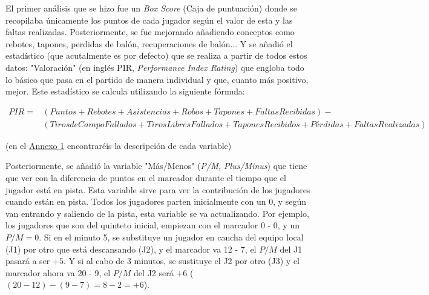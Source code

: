 \documentclass[paper=a4, fontsize=9pt]{article}
\begin{document}
El primer análisis que se hizo fue un \emph{Box Score} (Caja de puntuación) donde se recopilaba únicamente los puntos de cada jugador según el valor de esta y las faltas realizadas. Posteriormente, se fue mejorando añadiendo conceptos como rebotes, tapones, perdidas de balón, recuperaciones de balón... Y se añadió el estadístico (que acutalmente es por defecto) que se realiza a partir de todos estos datos: "Valoración" (en inglés PIR, \emph{Performance Index Rating}) que engloba todo lo básico que pasa en el partido de manera individual y que, cuanto más positivo, mejor. Este estadístico se calcula utilizando la siguiente fórmula:

\begin{equation} \label{eq1}
\begin{split}
PIR = & (Puntos + Rebotes + Asistencias + Robos + Tapones + Faltas Recibidas) - \\
      & (Tiros de Campo Fallados + Tiros Libres Fallados + Tapones Recibidos + Pérdidas + Faltas Realizadas)
\end{split}
\end{equation}

\centerline{(en el \hyperref[sec:Annexo1]{Annexo 1} encontraréis la descripción de cada variable)}

\vspace{0.2cm}

Posteriormente, se añadió la variable "Más/Menos" (\emph{P/M, Plus/Minus}) que tiene que ver con la diferencia de puntos en el marcador durante el tiempo que el jugador está en pista. Esta variable sirve para ver la contribución de los jugadores cuando están en pista. Todos los jugadores parten inicialmente con un 0, y según van entrando y saliendo de la pista, esta variable se va actualizando. Por ejemplo, los jugadores que son del quinteto inicial, empiezan con el marcador 0 - 0, y un $P/M = 0$. Si en el minuto 5, se substituye un jugador en cancha del equipo local (J1) por otro que está descansando (J2), y el marcador va 12 - 7, el $P/M$ del J1 pasará a ser $+5$. Y si al cabo de 3 minutos, se sustituye el J2 por otro (J3) y el marcador ahora va 20 - 9, el $P/M$ del J2 será $+6$ ($(20-12) - (9-7) = 8 - 2 = +6$).
\end{document}
